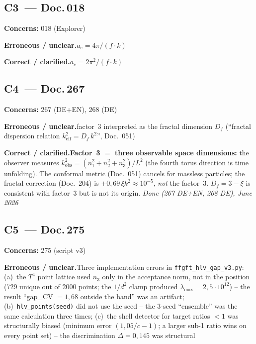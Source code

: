 \subsection*{C3~--- Doc.\,018}

\noindent\textbf{Concerns:} 018 (Explorer)


\smallskip\noindent\textbf{Erroneous / unclear.}\quad $a_e = 4\pi/(f \cdot k)$


\smallskip\noindent\textbf{Correct / clarified.}\quad $a_e = 2\pi^2/(f \cdot k)$


\medskip


\subsection*{C4~--- Doc.\,267}

\noindent\textbf{Concerns:} 267 (DE+EN), 268 (DE)


\smallskip\noindent\textbf{Erroneous / unclear.}\quad factor~3 interpreted as the fractal dimension $D_f$ (\enquote{fractal dispersion relation $k^2_\mathrm{eff}=D_f\,k^2$}, Doc.~051)


\smallskip\noindent\textbf{Correct / clarified.}\quad \textbf{Factor~3 $=$ three observable space dimensions:} the observer measures $k_\mathrm{obs}^2=(n_1^2+n_2^2+n_3^2)/L^2$ (the fourth torus direction is time unfolding). The conformal metric (Doc.~051) cancels for massless particles; the fractal correction (Doc.~204) is $+0{,}69\,\xi k^2\approx10^{-5}$, \emph{not} the factor~3. $D_f=3-\xi$ is consistent with factor~3 but is not its origin. \emph{Done (267 DE+EN, 268 DE), June 2026}


\medskip


\subsection*{C5~--- Doc.\,275}

\noindent\textbf{Concerns:} 275 (script v3)


\smallskip\noindent\textbf{Erroneous / unclear.}\quad Three implementation errors in \texttt{ffgft\_hlv\_gap\_v3.py}:
  (a)~the $T^4$ point lattice used $n_3$ only in the acceptance norm, not in
  the position (729 unique out of 2000 points; the $1/d^2$ clamp produced
  $\lambda_\mathrm{max}=2{,}5{\cdot}10^{12}$) -- the result
  \enquote{gap\_CV $=1{,}68$ outside the band} was an artifact;
  (b)~\texttt{hlv\_points(seed)} did not use the seed -- the
  3-seed \enquote{ensemble} was the same calculation three times;
  (c)~the shell detector for target ratios $<1$ was structurally biased
  (minimum error $(1{,}05/c-1)$; a larger sub-1 ratio wins on every
  point set) -- the discrimination $\Delta=0{,}145$ was structural


